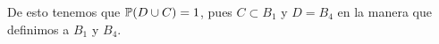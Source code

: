 De esto tenemos que $\mathbb{P}(D \cup C) = 1$, pues $C \subset B_1$ y $D = B_4$ en la manera que definimos a $B_1$ y $B_4$.\par\null




